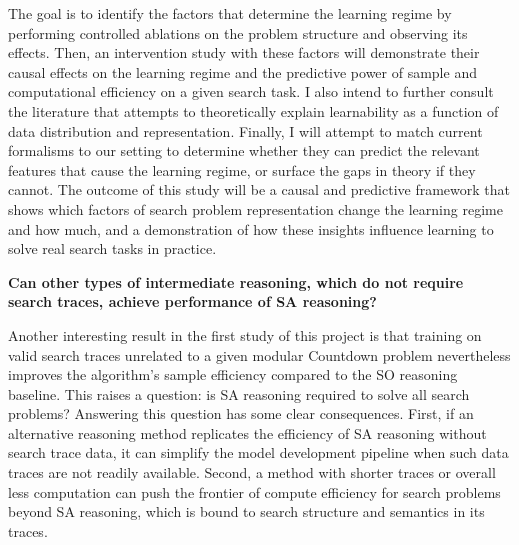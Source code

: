 The goal is to identify the factors that determine the learning regime by performing controlled ablations on the problem structure and observing its effects.
Then, an intervention study with these factors will demonstrate their causal effects on the learning regime and the predictive power of sample and computational efficiency on a given search task.
I also intend to further consult the literature that attempts to theoretically explain learnability as a function of data distribution and representation.
Finally, I will attempt to match current formalisms to our setting to determine whether they can predict the relevant features that cause the learning regime, or surface the gaps in theory if they cannot.
The outcome of this study will be a causal and predictive framework that shows which factors of search problem representation change the learning regime and how much, and a demonstration of how these insights influence learning to solve real search tasks in practice.

\bigskip

\textbf{Can other types of intermediate reasoning, which do not require search traces, achieve performance of SA reasoning?}

\bigskip

Another interesting result in the first study of this project is that training on valid search traces unrelated to a given modular Countdown problem nevertheless improves the algorithm's sample efficiency compared to the SO reasoning baseline.
This raises a question: is SA reasoning required to solve all search problems?
Answering this question has some clear consequences.
First, if an alternative reasoning method replicates the efficiency of SA reasoning without search trace data, it can simplify the model development pipeline when such data traces are not readily available.
Second, a method with shorter traces or overall less computation can push the frontier of compute efficiency for search problems beyond SA reasoning, which is bound to search structure and semantics in its traces.

